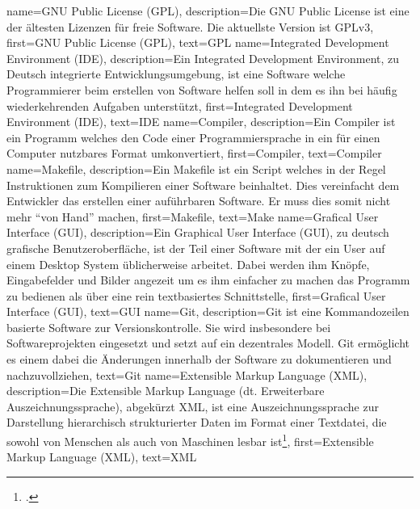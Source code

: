 {
    name={GNU Public License (GPL)},
    description={Die GNU Public License ist eine der ältesten Lizenzen für
      freie Software. Die aktuellste Version ist GPLv3},
    first={GNU Public License (GPL)},
    text={GPL}
}
{
    name={Integrated Development Environment (IDE)},
    description={Ein Integrated Development Environment, zu Deutsch integrierte
        Entwicklungsumgebung, ist eine Software welche Programmierer beim
        erstellen von Software helfen soll in dem es ihn bei häufig
        wiederkehrenden Aufgaben unterstützt},
    first={Integrated Development Environment (IDE)},
    text={IDE}
}
{
    name={Compiler},
    description={Ein Compiler ist ein Programm welches den Code einer
      Programmiersprache in ein für einen Computer nutzbares Format
      umkonvertiert},
    first={Compiler},
    text={Compiler}
}
{
    name={Makefile},
    description={Ein Makefile ist ein Script welches in der Regel Instruktionen
    zum Kompilieren einer Software beinhaltet. Dies vereinfacht dem Entwickler
    das erstellen einer auführbaren Software. Er muss dies somit nicht mehr
    ``von Hand'' machen},
    first={Makefile},
    text={Make}
}
{
    name={Grafical User Interface (GUI)},
    description={Ein Graphical User Interface (GUI), zu deutsch grafische
      Benutzeroberfläche, ist der Teil einer Software mit der ein User auf
      einem Desktop System üblicherweise arbeitet. Dabei werden ihm Knöpfe,
      Eingabefelder und Bilder angezeit um es ihm einfacher zu machen das
      Programm zu bedienen als über eine rein textbasiertes Schnittstelle},
    first={Grafical User Interface (GUI)},
    text={GUI}
}
{
    name={Git},
    description={Git ist eine Kommandozeilen basierte Software zur
      Versionskontrolle. Sie wird insbesondere bei Softwareprojekten eingesetzt
    und setzt auf ein dezentrales Modell. Git ermöglicht es einem dabei die
    Änderungen innerhalb der Software zu dokumentieren und nachzuvollziehen},
    text={Git}
}
{
    name={Extensible Markup Language (XML)},
    description={Die Extensible Markup Language (dt. Erweiterbare
      Auszeichnungssprache), abgekürzt XML, ist eine Auszeichnungssprache zur
      Darstellung hierarchisch strukturierter Daten im Format einer Textdatei, die
      sowohl von Menschen als auch von Maschinen lesbar ist\footcite{xml}\pagebreak},
    first={Extensible Markup Language (XML)},
    text={XML}
}
